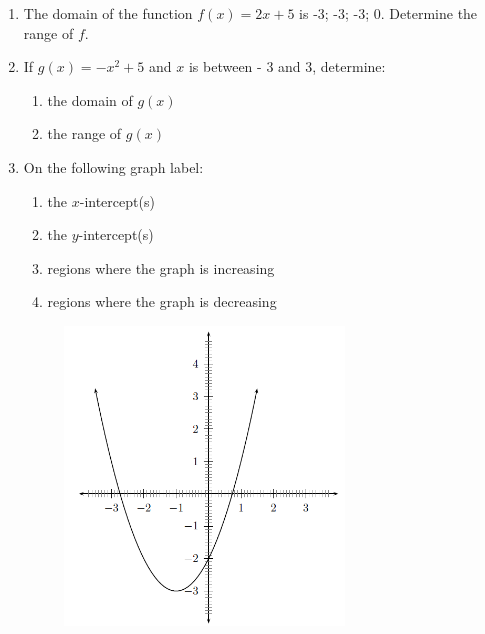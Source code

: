         \label{m39337*id237058}\begin{enumerate}[noitemsep, label=\textbf{\arabic*}. ] 
            \label{m39337*uid54}\item The domain of the function $f\left(x\right)=2x+5$ is -3; -3; -3; 0. Determine the range of $f$.
        \label{m39337*uid55}\item If $g\left(x\right)=-{x}^{2}+5$ and $x$ is between - 3 and 3, determine:
\label{m39337*id237164}\begin{enumerate}[noitemsep, label=\textbf{\alph*}. ] 
            \label{m39337*uid56}\item the domain of $g\left(x\right)$\label{m39337*uid57}\item the range of $g\left(x\right)$\end{enumerate}
                \label{m39337*uid58}\item On the following graph label:
\label{m39337*id237234}\begin{enumerate}[noitemsep, label=\textbf{\alph*}. ] 
            \label{m39337*uid59}\item the $x$-intercept(s)
\label{m39337*uid60}\item the $y$-intercept(s)
\label{m39337*uid61}\item regions where the graph is increasing
\label{m39337*uid62}\item regions where the graph is decreasing
\end{enumerate}
    \setcounter{subfigure}{0}
	\begin{figure}[H] %
    \begin{center}
    \label{m39337*id237308!!!underscore!!!media}\label{m39337*id237308!!!underscore!!!printimage}\includegraphics[height=300px]{col11306.imgs/m39337_MG10C11_003.png} %

\end{center}
\end{figure}
\end{enumerate}
